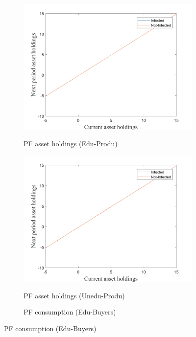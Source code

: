\begin{figure}[H]
\bigskip
\begin{subfigure}{0.5\textwidth}\caption{PF asset holdings (Edu-Produ)}
   \includegraphics[width=\linewidth,height = 0.22\textheight]{figures/pre/FIG3.png}
    \label{fig_dert}
\end{subfigure}
\hspace*{\fill}
\begin{subfigure}{0.5\textwidth}\caption{PF asset holdings (Unedu-Produ)}
   \includegraphics[width=\linewidth,height = 0.22\textheight]{figures/pre/FIG4.png}
    \label{fig:x_b}
\end{subfigure}
\bigskip
\begin{subfigure}{0.5\textwidth}\caption{PF consumption (Edu-Buyers)}

\end{subfigure}
\end{figure}
